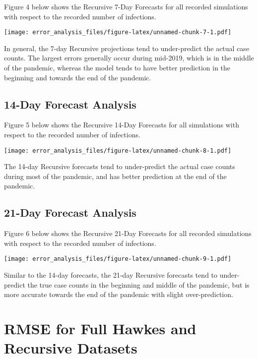 \documentclass[
]{article}
\begin{document}
Figure 4 below shows the Recursive 7-Day Forecasts for all recorded
simulations with respect to the recorded number of infections.\newline

\texttt{[image: error\_analysis\_files/figure-latex/unnamed-chunk-7-1.pdf]}

In general, the 7-day Recursive projections tend to under-predict the
actual case counts. The largest errors generally occur during mid-2019,
which is in the middle of the pandemic, whereas the model tends to have
better prediction in the beginning and towards the end of the pandemic.

\pagebreak

\hypertarget{day-forecast-analysis-4}{%
\subsection{14-Day Forecast Analysis}\label{day-forecast-analysis-4}}

Figure 5 below shows the Recursive 14-Day Forecasts for all simulations
with respect to the recorded number of infections.\newline

\texttt{[image: error\_analysis\_files/figure-latex/unnamed-chunk-8-1.pdf]}

The 14-day Recursive forecasts tend to under-predict the actual case
counts during most of the pandemic, and has better prediction at the end
of the pandemic.

\pagebreak

\hypertarget{day-forecast-analysis-5}{%
\subsection{21-Day Forecast Analysis}\label{day-forecast-analysis-5}}

Figure 6 below shows the Recursive 21-Day Forecasts for all recorded
simulations with respect to the recorded number of infections.\newline

\texttt{[image: error\_analysis\_files/figure-latex/unnamed-chunk-9-1.pdf]}

Similar to the 14-day forecasts, the 21-day Recursive forecasts tend to
under-predict the true case counts in the beginning and middle of the
pandemic, but is more accurate towards the end of the pandemic with
slight over-prediction.

\pagebreak

\hypertarget{rmse-for-full-hawkes-and-recursive-datasets}{%
\section{RMSE for Full Hawkes and Recursive
Datasets}\label{rmse-for-full-hawkes-and-recursive-datasets}}
\end{document}

